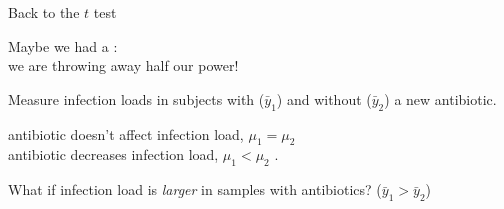 \begin{frame}{Back to the $t$ test}
    
    Maybe we had a :\\
    we are throwing away half our power!

    \vspace{2em}

    Measure infection loads in subjects with ($\bar y_1$) and without ($\bar y_2$) a new antibiotic. 

    \vspace{1em}

     antibiotic doesn't affect infection load, $\mu_1 = \mu_2$ \\
     antibiotic decreases infection load, $\mu_1< \mu_2$ .

    \vspace{2em}
    \pause

    \alert{What if} infection load is \emph{larger} in samples with antibiotics? ($\bar y_1 > \bar y_2$)


\end{frame}

